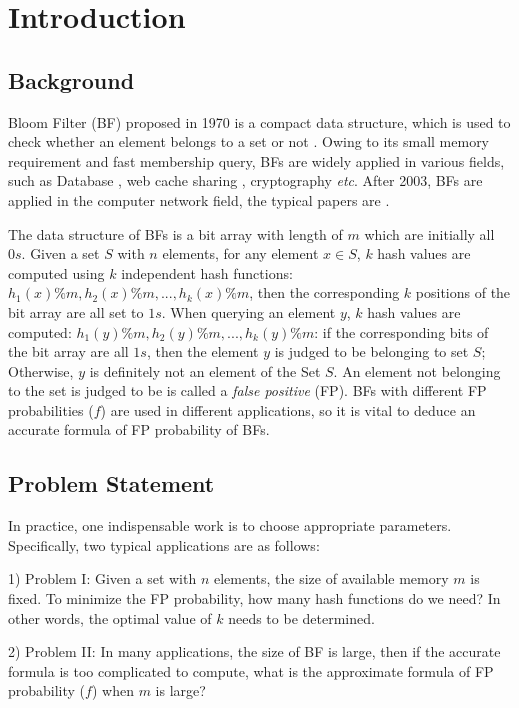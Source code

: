 \section{Introduction}

\subsection{Background}
Bloom Filter (BF) proposed in 1970 is a compact data structure, which is used to check whether an element belongs to a set or not \cite{BF1970}. Owing to its small memory requirement and fast membership query, BFs are widely applied in various fields, such as Database \cite{DatabaseFile,DatabaseText}, web cache sharing \cite{webcaching}, cryptography \cite{encrypt} \textit{etc}. After 2003, BFs are applied in the computer network field, the typical papers are \cite{sig03PBF, yuConext09, BFDanLi, BF_TC, HASH-100G}.

The data structure of BFs is a bit array with length of $m$ which are initially all $0s$. 
Given a set $S$ with $n$ elements, for any element $x\in S$, $k$ hash values are computed using $k$ independent hash functions: $h_1(x) \% m, h_2(x) \% m,..., h_k(x) \% m$, then the corresponding $k$ positions of the bit array are all set to $1s$. When querying an element $y$, $k$ hash values are computed: $h_1(y) \% m, h_2(y) \% m,..., h_k(y) \% m$: if the corresponding bits of the bit array are all $1s$, then the element $y$ is judged to be belonging to set $S$; Otherwise, $y$ is definitely not an element of the Set $S$. An element not belonging to the set is judged to be is called a \textit{false positive} (FP). BFs with different FP probabilities ($f$) are used in different applications, so it is vital to deduce an accurate formula of FP probability of BFs. 

\subsection{Problem Statement}
In practice, one indispensable work is to choose appropriate parameters. Specifically, two typical applications are as follows:

1) Problem I: Given a set with $n$ elements, the size of available memory $m$ is fixed. To minimize the FP probability, how many hash functions do we need? In other words, the optimal value of $k$ needs to be determined. 

2) Problem II: In many applications, the size of BF is large, then if the accurate formula is too complicated to compute, what is the approximate formula of FP probability ($f$) when $m$ is large?

